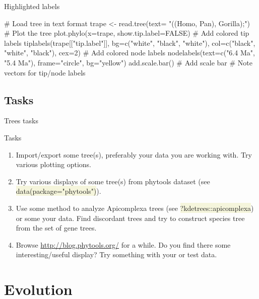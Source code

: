 \documentclass[compress, ucs, xelatex, 11pt, xcolor=svgnames, aspectratio=169,
	hyperref={
		bookmarks=true,
		unicode=true,
		colorlinks=true,
		pdftitle={Molecular data in R},
		plainpages=false,
		pdfauthor={Vojtech Zeisek},
		pdfsubject={Course about phylogeny and evolution in R},
		pdfcreator={XeLaTeX},
		pdfkeywords={R, evolution, phylogeny, molecular data},
		linkcolor=Crimson, %
		anchorcolor=Magenta, %
		citecolor=Magenta, %
		filecolor=Magenta, %
		menucolor=Magenta, %
		urlcolor=DodgerBlue, %
		pdftex},
	url={hyphens, lowtilde} %
	]{beamer}
\renewcommand{\texttt}[1]{\colorbox{Beige}{{\ttfamily #1}}}
\begin{document}
\begin{frame}[fragile]{Highlighted labels}
	\begin{multicols}{2}
		\vfill
		\begin{center}
			\texttt{[image: highlight.png]}
		\end{center}
		\vfill
		\begin{spluscode}
    # Load tree in text format
    trape <- read.tree(text=
      "((Homo, Pan), Gorilla);")
    # Plot the tree
    plot.phylo(x=trape,
      show.tip.label=FALSE)
    # Add colored tip labels
    tiplabels(trape[["tip.label"]],
      bg=c("white", "black",
      "white"), col=c("black",
      "white", "black"), cex=2)
    # Add colored node labels
    nodelabels(text=c("6.4 Ma",
      "5.4 Ma"), frame="circle",
      bg="yellow")
    add.scale.bar() # Add scale bar
    # Note vectors for tip/node labels
		\end{spluscode}
	\end{multicols}
\end{frame}

\subsection{Tasks}

\begin{frame}{Trees tasks}
	\begin{exampleblock}{Tasks}
		\begin{enumerate}
			\item Import/export some tree(s), preferably your data you are working with. Try various plotting options.
			\item Try various displays of some tree(s) from phytools dataset (see \texttt{data(package="phytools")}).
			\item Use some method to analyze Apicomplexa trees (see \texttt{?kdetrees::apicomplexa}) or some your data. Find discordant trees and try to construct species tree from the set of gene trees.
			\item Browse \url{http://blog.phytools.org/} for a while. Do you find there some interesting/useful display? Try something with your or test data.
		\end{enumerate}
	\end{exampleblock}
\end{frame}

\section{Evolution}
\end{document}
